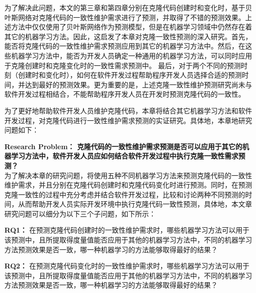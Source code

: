 为了解决此问题，本文的第三章和第四章分别在克隆代码创建时和变化时，基于贝叶斯网络对克隆代码的一致性维护需求进行了预测，并取得了不错的预测效果。上述方法中仅仅使用了贝叶斯网络作为预测模型，但是在机器学习领域中仍然存在着其它的机器学习方法。因此，这启发了本章对克隆一致性预测的深入研究。首先，能否将克隆代码的一致性维护需求预测应用到其它的机器学习方法中。然后，在这些机器学习方法中，能否为开发人员确定一种通用的机器学习方法，可以同时应用于克隆创建时和克隆变化时的一致性需求预测中。 最后，对于两个不同的预测时刻（创建时和变化时），如何在软件开发过程帮助程序开发人员选择合适的预测时间，并达到最好的预测效果。更为重要的是，上述克隆一致性维护预测研究尚未与软件开发过程相结合，不能帮助程序开发人员在开发时预测克隆代码的一致性。

为了更好地帮助软件开发人员维护克隆代码，本章将结合其它机器学习方法和软件开发过程，对克隆代码进行一致性维护需求预测的实证研究。具体地，本章地研究问题如下：

\textbf{Research Problem： 克隆代码的一致性维护需求预测是否可以应用于其它的机器学习方法中，软件开发人员应如何结合软件开发过程中执行克隆一致性需求预测？}\\

为了解决本章的研究问题，将使用五种不同机器学习方法来预测克隆代码的一致性维护需求，并且分别在克隆代码创建时和克隆代码变化时进行预测。同时，在预测克隆一致性的过程中充分考虑并结合软件开发过程，比较和讨论两种不同预测的时间，从而帮助开发人员实际开发环境中执行克隆代码一致性预测，具体地，本文章研究问题可以细分为以下三个子问题，如下所示：

{\bf RQ1：}
在预测克隆代码创建时的一致性维护需求时，哪些机器学习方法可以用于该预测中，且所提取得度量值能否应用于其他的机器学习方法中，不同的机器学习方法预测效果是否一致，哪一种机器学习的方法能够取得最好的结果？

{\bf RQ2：}
在预测克隆代码变化时的一致性维护需求时，哪些机器学习方法可以用于该预测中，且所提取得度量值能否应用于其他的机器学习方法中，不同的机器学习方法预测效果是否一致，哪一种机器学习的方法能够取得最好的结果？

